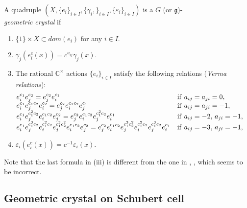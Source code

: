 \begin{df}
\label{def-gc}
A quadruple $(X,\{e_i\}_{i\in I},\{\gamma_i,\}_{i\in I},
\{{\varepsilon}_i\}_{i\in I})$ is a 
$G$ (or ${\mathfrak g}$)-\\{\it geometric} {\it crystal} 
if
\begin{enumerate}
\item
$\{1\}\times X\subset dom(e_i)$ 
for any $i\in I$.
\item
$\gamma_j(e^c_i(x))=c^{a_{ij}}\gamma_j(x)$.
\item
The rational ${\mathbb C}^\times$ actions $\{e_i\}_{i\in I}$ satisfy the
following relations ({\it Verma relations}):
\[
 \begin{array}{lll}
&\hspace{-20pt}e^{c_1}_{i}e^{c_2}_{j}
=e^{c_2}_{j}e^{c_1}_{i}&
{\rm if }\,\,a_{ij}=a_{ji}=0,\\
&\hspace{-20pt} e^{c_1}_{i}e^{c_1c_2}_{j}e^{c_2}_{i}
=e^{c_2}_{j}e^{c_1c_2}_{i}e^{c_1}_{j}&
{\rm if }\,\,a_{ij}=a_{ji}=-1,\\
&\hspace{-20pt}
e^{c_1}_{i}e^{c^2_1c_2}_{j}e^{c_1c_2}_{i}e^{c_2}_{j}
=e^{c_2}_{j}e^{c_1c_2}_{i}e^{c^2_1c_2}_{j}e^{c_1}_{i}&
{\rm if }\,\,a_{ij}=-2,\,
a_{ji}=-1,\\
&\hspace{-20pt}
e^{c_1}_{i}e^{c^3_1c_2}_{j}e^{c^2_1c_2}_{i}
e^{c^3_1c^2_2}_{j}e^{c_1c_2}_{i}e^{c_2}_{j}
=e^{c_2}_{j}e^{c_1c_2}_{i}e^{c^3_1c^2_2}_{j}e^{c^2_1c_2}_{i}
e^{c^3_1c_2}_je^{c_1}_i&
{\rm if }\,\,a_{ij}=-3,\,
a_{ji}=-1,
\end{array}
\]
\item
${\varepsilon}_i(e_i^c(x))=c^{-1}{\varepsilon}_i(x)$.
\end{enumerate}
\end{df}
Note that the last formula in (iii) is different from the one in 
\cite{BK}, \cite{N}, \cite{N2} which seems to be
incorrect.

\subsection{Geometric crystal on Schubert cell}
\label{schubert}

